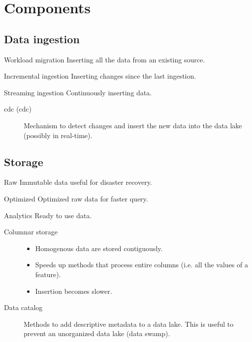 \section{Components}

\subsection{Data ingestion} 
    \begin{descriptionlist}
        \item[Workload migration] 
            Inserting all the data from an existing source.
        \item[Incremental ingestion]
            Inserting changes since the last ingestion.
        \item[Streaming ingestion]   
            Continuously inserting data.
    \end{descriptionlist}

    \begin{description}
        \item[\Acl{cdc} (\Acs{cdc})] 
            Mechanism to detect changes and insert the new data into the data lake (possibly in real-time).
    \end{description}

\subsection{Storage}
\begin{descriptionlist}
    \item[Raw] 
        Immutable data useful for disaster recovery.
    \item[Optimized] 
        Optimized raw data for faster query.
    \item[Analytics] 
        Ready to use data.
\end{descriptionlist}

\begin{description}
    \item[Columnar storage] \phantom{}
        \begin{itemize}
            \item Homogenous data are stored contiguously.
            \item Speeds up methods that process entire columns (i.e. all the values of a feature).
            \item Insertion becomes slower.
        \end{itemize}

    \item[Data catalog]
        Methods to add descriptive metadata to a data lake.
        This is useful to prevent an unorganized data lake (data swamp).
\end{description}
        
